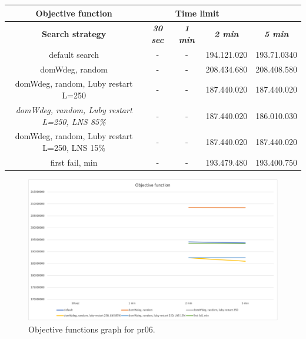 {
\renewcommand{\arraystretch}{2}
\begin{longtable}[h]{| c | c | c | c | c |}
    \hline
    \textbf{Objective function} & \multicolumn{3}{c}{Time limit} & \\
    \hline
    \textbf{Search strategy} & \textbf{\textit{30 sec}} & \textbf{\textit{1 min}} & \textbf{\textit{2 min}} & \textbf{\textit{5 min}} \\
    \hline
    \endhead
    default search                                         & - & - & 194.121.020 & 193.71.0340 \\
    \hline
    domWdeg, random                                        & - & - & 208.434.680 & 208.408.580 \\
    \hline
    domWdeg, random, Luby restart L=250                    & - & - & 187.440.020 & 187.440.020 \\
    \hline
    \textit{domWdeg, random, Luby restart L=250, LNS 85\%} & - & - & 187.440.020 & 186.010.030 \\
    \hline
    domWdeg, random, Luby restart L=250, LNS 15\%          & - & - & 187.440.020 & 187.440.020 \\
    \hline
    first fail, min                                        & - & - & 193.479.480 & 193.400.750 \\
    \hline
\end{longtable}
}
\begin{figure}[H]
    \centering
    \includegraphics[width=1.0\columnwidth]{../graphs/pr06-objf.png}
    \caption{Objective functions graph for pr06.}
\end{figure}

